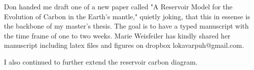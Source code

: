 Don handed me draft one of a new paper called "A Reservoir Model for the Evolution of Carbon in the Earth's mantle," quietly joking, that this in essense is the backbone of my master's thesis. The goal is to have a typed manuscript with the time frame of one to two weeks. Marie Weisfeiler has kindly shared her manuscript including latex files and figures on dropbox lokavarpuh@gmail.com. 

I also continued to further extend the reservoir carbon diagram.

